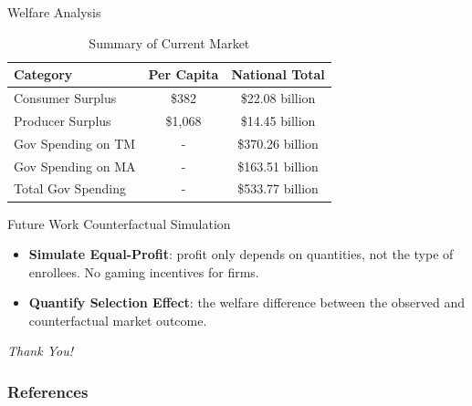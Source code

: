 \documentclass[professionalfonts, aspectratio=169]{beamer}
\begin{document}
\begin{frame}{Welfare Analysis}
  \begin{table}
    \centering
    \caption{Summary of Current Market}
    \begin{tabular}{|l|c|c|}
    \hline
    \textbf{Category}                            & \textbf{Per Capita} & \textbf{National Total}  \\ \hline
    Consumer Surplus                             & \$382               & \$22.08 billion          \\ \hline
    Producer Surplus                             & \$1,068             & \$14.45 billion          \\ \hline
    Gov Spending on TM                           &  -                   & \$370.26 billion         \\ \hline
    Gov Spending on MA                           &  -                   & \$163.51 billion         \\ \hline
    Total Gov Spending                           &  -                   & \$533.77 billion         \\ \hline
    \end{tabular}
  \end{table}
\end{frame}

\begin{frame}{Future Work}
  Counterfactual Simulation
  \begin{itemize}
    \item \textbf{Simulate Equal-Profit}: profit only depends on quantities, not the type of enrollees. No gaming incentives for firms.
    \item \textbf{Quantify Selection Effect}: the welfare difference between the observed and counterfactual market outcome.
  \end{itemize}
\end{frame}

\begin{frame} %
  \begin{center}
  \Huge \textit{Thank You!} %
  \end{center}
\end{frame}

\newpage
\begin{frame} %
  \frametitle{References} %

\end{frame}
\end{document}
